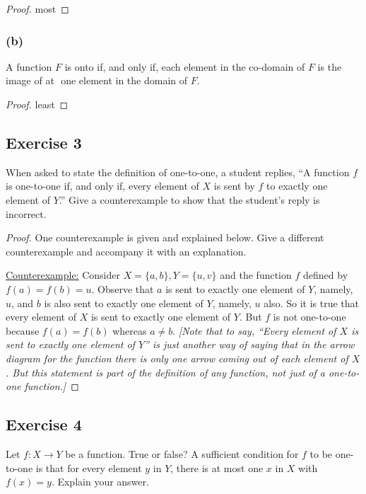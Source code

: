 \documentclass[14pt]{extarticle}
\newcommand{\fbl}{\underline{\hspace{1cm}}\,\,}
\begin{document}
\begin{proof}
most
\end{proof}

\subsubsection{(b)}
A function $F$ is onto if, and only if, each element in the co-domain of $F$ is the image of at \fbl one element in the 
domain of $F$.

\begin{proof}
least
\end{proof}

\subsection{Exercise 3}
When asked to state the definition of one-to-one, a student replies, “A function $f$ is one-to-one if, and only if, 
every element of $X$ is sent by $f$ to exactly one element of $Y$.” Give a counterexample to show that the student’s 
reply is incorrect.

\begin{proof}
One counterexample is given and explained below. Give a different counterexample and accompany it with an explanation. 

\underline{Counterexample:} Consider \(X = \{a,b\}, Y = \{u,v\}\) and the function $f$ defined by\(f(a) = f(b) =u\).
Observe that $a$ is sent to exactly one element of $Y$, namely, $u$, and $b$ is also sent to exactly one element of 
$Y$, namely, $u$ also. So it is true that every element of $X$ is sent to exactly one element of $Y$. But $f$ is not 
one-to-one because $f(a) = f(b)$ whereas $a \neq b$. {\it [Note that to say, “Every element of $X$ is sent to exactly 
one element of $Y$” is just another way of saying that in the arrow diagram for the function there is only one arrow 
coming out of each element of $X$. But this statement is part of the definition of any function, not just of a 
one-to-one function.]}
\end{proof}

\subsection{Exercise 4}
Let \(f: X \to Y\) be a function. True or false? A sufficient condition for $f$ to be one-to-one is that for
every element $y$ in $Y$, there is at most one $x$ in $X$
with \(f(x) = y\). Explain your answer.
\end{document}
